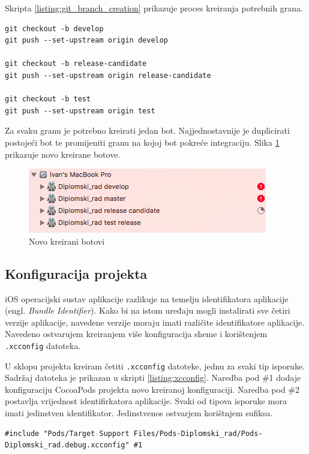 \documentclass[times, utf8, diplomski, numeric]{fer}
\newcommand{\eng}[1]{(engl. \textit{#1})}
\begin{document}
\begin{appendices}
Skripta \ref{listing:git_branch_creation} prikazuje proces kreiranja potrebnih grana.

\begin{lstlisting}[caption=Kreiranje potrebnih grana Gitflow radnog toka, label=listing:git_branch_creation]
git checkout -b develop
git push --set-upstream origin develop

git checkout -b release-candidate
git push --set-upstream origin release-candidate

git checkout -b test
git push --set-upstream origin test
\end{lstlisting}

Za svaku granu je potrebno kreirati jedan bot. Najjednostavnije je duplicirati postojeći bot te promijeniti granu na kojoj bot pokreće integraciju. Slika \ref{fig:MultipleBots} prikazuje novo kreirane botove.

\begin{figure}
\centering
\includegraphics[scale=0.7]{MultipleBots}
\caption{Novo kreirani botovi}
\label{fig:MultipleBots}
\end{figure}

\subsection{Konfiguracija projekta}

iOS operacijski sustav aplikacije razlikuje na temelju identifikatora aplikacije \eng{Bundle Identifier}. Kako bi na istom uređaju mogli instalirati sve četiri verzije aplikacije, navedene verzije moraju imati različite identifikatore aplikacije. Navedeno ostvarujem kreiranjem više konfiguracija sheme i korištenjem \verb|.xcconfig| datoteka.

U sklopu projekta kreiram četiti \verb|.xcconfig| datoteke, jednu za svaki tip isporuke. Sadržaj datoteka je prikazan u skripti \ref{listing:xcconfig}. Naredba pod \#1 dodaje konfiguraciju CocoaPods projekta novo kreiranoj konfiguraciji. Naredba pod \#2 postavlja vrijednost identifirkatora aplikacije. Svaki od tipova isporuke mora imati jedinstven identifikator. Jedinstvenos ostvarjem korištnjem sufiksa.

\begin{lstlisting}[caption=Sadržaj .xcconfig datoteke, label=listing:xcconfig]
#include "Pods/Target Support Files/Pods-Diplomski_rad/Pods-Diplomski_rad.debug.xcconfig" #1


\end{lstlisting}
\end{appendices}
\end{document}
